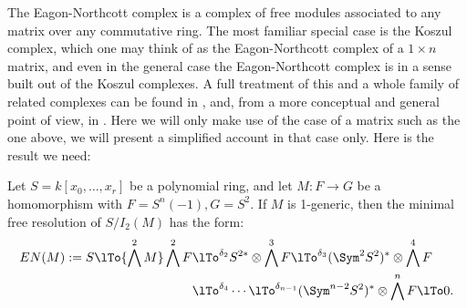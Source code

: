 The Eagon-Northcott complex is a complex of free modules associated to any matrix over any commutative ring. The most familiar special case is the Koszul complex, which one may think of as the Eagon-Northcott complex of a $1\times n$ matrix, and  even in the general case the Eagon-Northcott complex is in a sense built out of the Koszul complexes. A full treatment of this and a whole family of related complexes can be found in 
\cite[Appendix A2]{Eisenbud1995}, and, from a more conceptual and general point of view, in \cite{Weyman-book}. Here we will only
make use of the case of a matrix such as the one above, we will present a simplified account in that case only. Here is the result we need:

\begin{theorem}\label{Eagon-Northcott}
 Let $S = k[x_0,\dots, x_r]$ be a polynomial ring,  and let $M: F\to G$ be a homomorphism with
 $F = S^n(-1), G= S^2$. If $M$ is 1-generic, then the minimal free resolution of $S/I_2(M)$ has the form:
\begin{align*}
EN(M) := 
S \lTo{\bigwedge^2 M} 
 \bigwedge^2 F&
 \lTo^{\delta_{2}}
 S^{2*}\otimes \bigwedge^3 F  \lTo^{\delta_{3}}
  (\Sym^2S^{2})^*\otimes\bigwedge^4F  \\
 &\lTo^{\delta_{4}}\cdots\lTo^{\delta_{n-1}} 
(\Sym^{n-2}S^{2})^*\otimes\bigwedge^nF 
 \lTo 0.
\end{align*}
\end{theorem}

